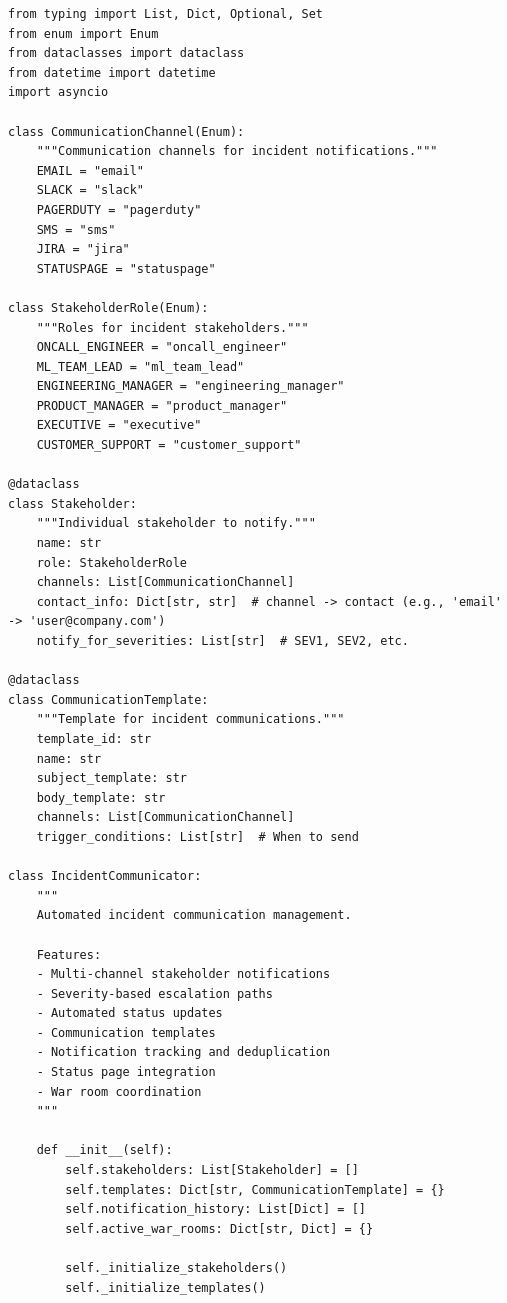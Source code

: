 \begin{lstlisting}[style=python, caption={Incident communication with multi-channel notifications}]
from typing import List, Dict, Optional, Set
from enum import Enum
from dataclasses import dataclass
from datetime import datetime
import asyncio

class CommunicationChannel(Enum):
    """Communication channels for incident notifications."""
    EMAIL = "email"
    SLACK = "slack"
    PAGERDUTY = "pagerduty"
    SMS = "sms"
    JIRA = "jira"
    STATUSPAGE = "statuspage"

class StakeholderRole(Enum):
    """Roles for incident stakeholders."""
    ONCALL_ENGINEER = "oncall_engineer"
    ML_TEAM_LEAD = "ml_team_lead"
    ENGINEERING_MANAGER = "engineering_manager"
    PRODUCT_MANAGER = "product_manager"
    EXECUTIVE = "executive"
    CUSTOMER_SUPPORT = "customer_support"

@dataclass
class Stakeholder:
    """Individual stakeholder to notify."""
    name: str
    role: StakeholderRole
    channels: List[CommunicationChannel]
    contact_info: Dict[str, str]  # channel -> contact (e.g., 'email' -> 'user@company.com')
    notify_for_severities: List[str]  # SEV1, SEV2, etc.

@dataclass
class CommunicationTemplate:
    """Template for incident communications."""
    template_id: str
    name: str
    subject_template: str
    body_template: str
    channels: List[CommunicationChannel]
    trigger_conditions: List[str]  # When to send

class IncidentCommunicator:
    """
    Automated incident communication management.

    Features:
    - Multi-channel stakeholder notifications
    - Severity-based escalation paths
    - Automated status updates
    - Communication templates
    - Notification tracking and deduplication
    - Status page integration
    - War room coordination
    """

    def __init__(self):
        self.stakeholders: List[Stakeholder] = []
        self.templates: Dict[str, CommunicationTemplate] = {}
        self.notification_history: List[Dict] = []
        self.active_war_rooms: Dict[str, Dict] = {}

        self._initialize_stakeholders()
        self._initialize_templates()


\end{lstlisting}
